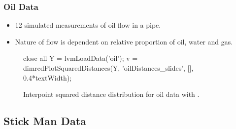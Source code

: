 \begin{frame}[fragile]
  \frametitle{Oil Data}
  \begin{itemize}
  \item 12 simulated measurements of oil flow in a pipe.
  \item Nature of flow is dependent on relative proportion of oil, water and
    gas.
  \end{itemize}
  \begin{figure}
    \begin{matlab}
    close all
    Y = lvmLoadData('oil');
    v = dimredPlotSquaredDistances(Y, 'oilDistances_slides', [], 0.4*textWidth);
    \end{matlab}

  \begin{center}
  \end{center}
  
  \caption{Interpoint squared distance distribution for oil data
    with \captionInfo.}
  \end{figure}

\end{frame}

\subsection{Stick Man Data}

